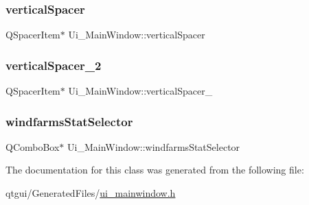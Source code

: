 \subsubsection{\texorpdfstring{verticalSpacer}{verticalSpacer}}
{\footnotesize\ttfamily Q\+Spacer\+Item$\ast$ Ui\+\_\+\+Main\+Window\+::vertical\+Spacer}

\mbox{\label{class_ui___main_window_adc1f5fdd97fb3729999c56902d0fa591}} 
\subsubsection{\texorpdfstring{verticalSpacer\_2}{verticalSpacer\_2}}
{\footnotesize\ttfamily Q\+Spacer\+Item$\ast$ Ui\+\_\+\+Main\+Window\+::vertical\+Spacer\+\_}

\mbox{\label{class_ui___main_window_a81b58ec0d789b96ee13cfcbd396edaef}} 
\subsubsection{\texorpdfstring{windfarmsStatSelector}{windfarmsStatSelector}}
{\footnotesize\ttfamily Q\+Combo\+Box$\ast$ Ui\+\_\+\+Main\+Window\+::windfarms\+Stat\+Selector}



The documentation for this class was generated from the following file\+:\begin{DoxyCompactItemize}
\item 
qtgui/\+Generated\+Files/\mbox{\hyperlink{qtgui_2_generated_files_2ui__mainwindow_8h}{ui\+\_\+mainwindow.\+h}}\end{DoxyCompactItemize}
